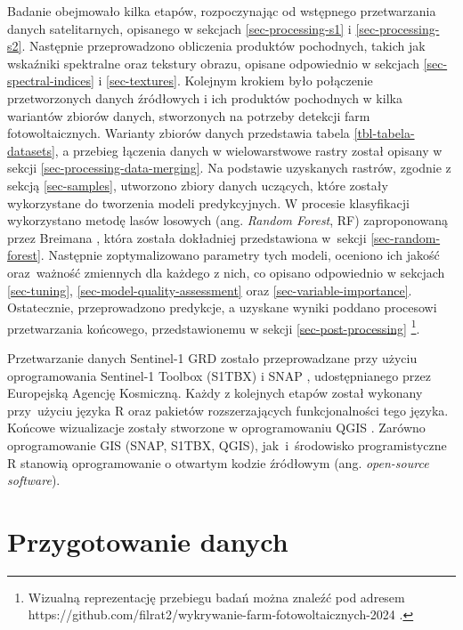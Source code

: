 \documentclass{amuthesis}
\begin{document}
Badanie obejmowało kilka etapów, rozpoczynając od wstępnego
przetwarzania danych satelitarnych, opisanego w sekcjach
\ref{sec-processing-s1} i \ref{sec-processing-s2}. Następnie
przeprowadzono obliczenia produktów pochodnych, takich jak wskaźniki
spektralne oraz tekstury obrazu, opisane odpowiednio w sekcjach
\ref{sec-spectral-indices} i \ref{sec-textures}. Kolejnym krokiem było
połączenie przetworzonych danych źródłowych i ich produktów pochodnych w
kilka wariantów zbiorów danych, stworzonych na potrzeby detekcji farm
fotowoltaicznych. Warianty zbiorów danych przedstawia tabela
\ref{tbl-tabela-datasets}, a przebieg łączenia danych w wielowarstwowe
rastry został opisany w sekcji \ref{sec-processing-data-merging}. Na
podstawie uzyskanych rastrów, zgodnie z sekcją \ref{sec-samples},
utworzono zbiory danych uczących, które zostały wykorzystane do
tworzenia modeli predykcyjnych. W procesie klasyfikacji wykorzystano
metodę lasów losowych (ang. \emph{Random Forest}, RF) zaproponowaną
przez Breimana \autocite*{breiman_2001_rf}, która została dokładniej
przedstawiona w~sekcji \ref{sec-random-forest}. Następnie
zoptymalizowano parametry tych modeli, oceniono ich jakość oraz~ważność
zmiennych dla każdego z nich, co opisano odpowiednio w sekcjach
\ref{sec-tuning}, \ref{sec-model-quality-assessment} oraz
\ref{sec-variable-importance}. Ostatecznie, przeprowadzono predykcje, a
uzyskane wyniki poddano procesowi przetwarzania końcowego,
przedstawionemu w sekcji \ref{sec-post-processing} \footnote{Wizualną
  reprezentację przebiegu badań można znaleźć pod adresem
  https://github.com/filrat2/wykrywanie-farm-fotowoltaicznych-2024 .}.

Przetwarzanie danych Sentinel-1 GRD zostało przeprowadzane przy użyciu
oprogramowania Sentinel-1 Toolbox (S1TBX) \autocite{s1tbx} i SNAP
\autocite{snap}, udostępnianego przez Europejską Agencję Kosmiczną.
Każdy z kolejnych etapów został wykonany przy~użyciu języka R
\autocite{R-base} oraz pakietów rozszerzających funkcjonalności tego
języka. Końcowe wizualizacje zostały stworzone w oprogramowaniu QGIS
\autocite{qgis}. Zarówno oprogramowanie GIS (SNAP, S1TBX, QGIS),
jak~i~środowisko programistyczne R stanowią oprogramowanie o otwartym
kodzie źródłowym (ang. \emph{open-source software}).

\hypertarget{sec-processing}{%
\section{Przygotowanie danych}\label{sec-processing}}
\end{document}
